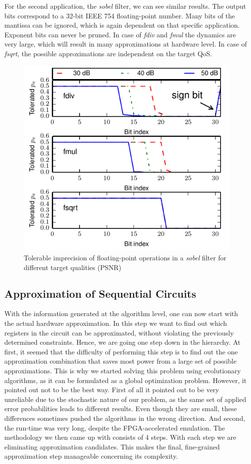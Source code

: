 \documentclass[conference]{IEEEtran}
\begin{document}
For the second application, the \emph{sobel} filter, we can see similar results. The output bits correspond to a 32-bit IEEE 754 floating-point number. Many bits of the mantissa can be ignored, which is again dependent on that specific application. Exponent bits can never be pruned. In case of \emph{fdiv} and \emph{fmul} the dynamics are very large, which will result in many approximations at hardware level. In case of \emph{fsqrt}, the possible approximations are independent on the target QoS.
\begin{figure}[tb]
  \centering
  \includegraphics[width=.48\textwidth]{figs/metrics_sobel}
  \caption{Tolerable imprecision of floating-point operations in a \emph{sobel} filter for different target qualities (PSNR)}
  \label{fig:metrics_sobel}
\end{figure}


\subsection{Approximation of Sequential Circuits}
\label{subsec:approximation}
With the information generated at the algorithm level, one can now start with the actual hardware approximation. In this step we want to find out which registers in the circuit can be approximated, without violating the previously determined constraints. Hence, we are going one step down in the hierarchy. At first, it seemed that the difficulty of performing this step is to find out the one approximation combination that saves most power from a large set of possible approximations. This is why we started solving this problem using evolutionary algorithms, as it can be formulated as a global optimization problem. However, it pointed out not to be the best way. First of all it pointed out to be very unreliable due to the stochastic nature of our problem, as the same set of applied error probabilities leads to different results. Even though they are small, these differences sometimes pushed the algorithms in the wrong direction. And second, the run-time was very long, despite the FPGA-accelerated emulation. The methodology we then came up with consists of 4 steps. With each step we are eliminating approximation candidates. This makes the final, fine-grained approximation step manageable concerning its complexity.
\end{document}
